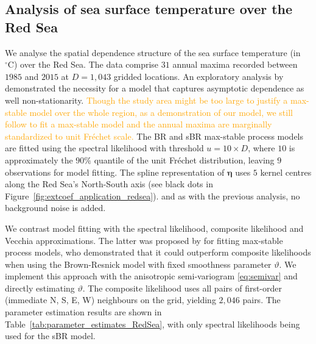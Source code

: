 \documentclass[12pt]{article}
\newcommand{\PZ}{\textcolor{orange}}
\begin{document}
\subsection{Analysis of sea surface temperature over the Red Sea}

We analyse the spatial dependence structure of the sea surface temperature (in $^\circ \textrm{C}$) over the Red Sea. The data comprise $31$ annual maxima recorded between $1985$ and $2015$ at $D=1,043$ gridded locations. An exploratory analysis by \citet{Hazra.Huser:2021} demonstrated the necessity for a model that captures asymptotic dependence as well non-stationarity. \PZ{Though the study area might be too large to justify a max-stable model over the whole region, as a demonstration of our model, we still follow \cite{Huser.Zhong:2023} to fit a max-stable model and the annual maxima are marginally standardized to unit Fr\'{e}chet scale.} The BR and sBR max-stable process models are fitted using the spectral likelihood with threshold $u=10\times D$, where $10$ is approximately the $90\%$ quantile of the unit Fr\'echet distribution, leaving $9$ observations for model fitting. The spline representation of $\bm\eta$ 
uses $5$ kernel centres 
along the Red Sea's North-South axis 
(see black dots in Figure~\ref{fig:extcoef_application_redsea}). 
and as with
the previous analysis, no background noise is added. 
%

We contrast model fitting with the spectral likelihood, composite likelihood and Vecchia approximations.
%
The latter was proposed by \cite{Huser.Zhong:2023} for fitting max-stable process models, who demonstrated that it could outperform composite likelihoods when using the Brown-Resnick model with fixed smoothness parameter $\vartheta$. We implement this approach with the anisotropic semi-variogram \eqref{eq:semivar} and directly estimating $\vartheta$.
%
The composite likelihood uses all pairs of first-order (immediate N, S, E, W) neighbours on the grid, yielding $2,046$ pairs. 
%
The parameter estimation results are shown in Table~\ref{tab:parameter_estimates_RedSea}, with only spectral likelihoods being used for the sBR model.
\end{document}

